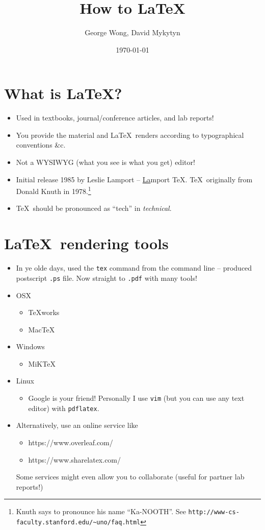 \documentclass[12pt]{article}
\begin{document}
\title{\vspace{-5em}How to \LaTeX}
\author{George Wong, David Mykytyn}
\date{\properdate\today}
\maketitle

\vspace{1em}

\section{What is \LaTeX?}
\begin{itemize}
\item Used in textbooks, journal/conference articles, and lab reports!
\item You provide the material and \LaTeX\ renders according to typographical conventions \&c.
\item Not a WYSIWYG (what you see is what you get) editor!
\item Initial release 1985 by Leslie Lamport -- \underline{La}mport \TeX. \TeX\ originally from Donald Knuth in 1978.\footnote{Knuth says to pronounce his name ``Ka-NOOTH''. See {\tt{}http://www-cs-faculty.stanford.edu/\textasciitilde{}uno/faq.html}}
\item \TeX\ should be pronounced as ``tech'' in \emph{technical}. %
\end{itemize}

\section{\LaTeX\ rendering tools}
\begin{itemize}
\item In ye olde days, used the {\tt tex} command from the command line -- produced postscript {\tt .ps} file. Now straight to {\tt .pdf} with many tools!
\item OSX
\begin{itemize}
\item TeXworks
\item MacTeX
\end{itemize}
\item Windows
\begin{itemize}
\item MiKTeX
\end{itemize}
\item Linux
\begin{itemize}
\item Google is your friend! Personally I use {\tt vim} (but you can use any text editor) with {\tt pdflatex}.
\end{itemize}
\item Alternatively, use an online service like
\begin{itemize}
\item https://www.overleaf.com/
\item https://www.sharelatex.com/
\end{itemize}
Some services might even allow you to collaborate (useful for partner lab reports!)
\end{itemize}
\end{document}
